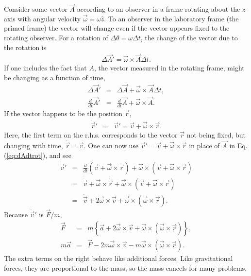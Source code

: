 Consider some vector $\vec{A}$ according to an observer in a frame rotating about the $z$ axis with angular velocity $\vec{\omega}=\omega\hat{z}$. To an observer in the laboratory frame (the primed frame) the vector will change even if the vector appears fixed to the rotating observer. For a rotation of $\Delta\theta=\omega\Delta t$, the change of the vector due to the rotation is
\begin{eqnarray}
\Delta\vec{A}'=\vec{\omega}\times\vec{A}\Delta t.
\end{eqnarray}
If one includes the fact that $A$, the vector measured in the rotating frame, might be changing as a function of time,
\begin{eqnarray}
\label{eq:dAdtrot}
\Delta\vec{A}'&=&\Delta\vec{A}+\vec{\omega}\times\vec{A}\Delta t,\\
\nonumber
\frac{d}{dt}\vec{A}'&=&\frac{d}{dt}\vec{A}+\vec{\omega}\times\vec{A}.
\end{eqnarray}
If the vector happens to be the position $\vec{r}$,
\begin{eqnarray}
\dot{\vec{r}}'&=&\vec{v}'=\vec{v}+\vec{\omega}\times\vec{r}.
\end{eqnarray}
Here, the first term on the r.h.s. corresponds to the vector $\vec{r}$ not being fixed, but changing with time, $\dot{\vec{r}}=\vec{v}$. One can now use $\vec{v}'=\vec{v}+\vec{\omega}\times\vec{r}$ in place of $\vec{A}$ in Eq. (\ref{eq:dAdtrot}), and see
\begin{eqnarray}
\dot{\vec{v}}'&=&\frac{d}{dt}(\vec{v}+\vec{\omega}\times\vec{r})+\vec{\omega}\times(\vec{v}+\vec{\omega}\times\vec{r})\\
\nonumber
&=&\dot{\vec{v}}+\vec{\omega}\times\dot\vec{r}+\vec{\omega}\times\left(\vec{v}+\vec{\omega}\times\vec{r}\right)\\
\nonumber
&=&\dot{\vec{v}}+2\vec{\omega}\times\vec{v}+\vec{\omega}\times(\vec{\omega}\times\vec{r}).
\end{eqnarray}
Because $\dot{\vec{v}}'$ is $\vec{F}/m$,
\begin{eqnarray}
\label{eq:FmaRotatingFrame}
\vec{F}&=&m\left\{\vec{a}+2\vec{\omega}\times\vec{v}+\vec{\omega}\times(\vec{\omega}\times\vec{r})\right\},\\
\nonumber
m\vec{a}&=&\vec{F}-2m\vec{\omega}\times\vec{v}-m\vec{\omega}\times(\vec{\omega}\times\vec{r}).
\end{eqnarray}
The extra terms on the right behave like additional forces. Like gravitational forces, they are proportional to the mass, so the mass cancels for many problems. 

